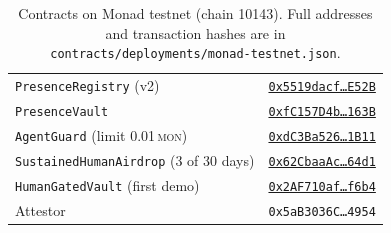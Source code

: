 \documentclass[10pt]{article}
\newcommand{\code}[1]{\texttt{\small #1}}
\newcommand{\mon}{\textsc{mon}}
\begin{document}
\begin{table}[h]\small\centering
\caption{Contracts on Monad testnet (chain 10143). Full addresses and transaction hashes are in
\code{contracts/deployments/monad-testnet.json}.}\label{tab:contracts}
\begin{tabular}{@{}ll@{}}\toprule
\code{PresenceRegistry} (v2) & \href{https://testnet.monadvision.com/address/0x5519dacface816519ACa3ee3cD592fd4c61dE52B}{\code{0x5519dacf\ldots E52B}}\\
\code{PresenceVault} & \href{https://testnet.monadvision.com/address/0xfC157D4b8D9573413a3A793056D7625eD972163B}{\code{0xfC157D4b\ldots 163B}}\\
\code{AgentGuard} (limit 0.01\,\mon{}) & \href{https://testnet.monadvision.com/address/0xdC3Ba526FF565D0c76131D54a30aFA3c55041B11}{\code{0xdC3Ba526\ldots 1B11}}\\
\code{SustainedHumanAirdrop} (3 of 30 days) & \href{https://testnet.monadvision.com/address/0x62CbaaAc53ef415fE0262E41e3ce4C2B9af164d1}{\code{0x62CbaaAc\ldots 64d1}}\\
\code{HumanGatedVault} (first demo) & \href{https://testnet.monadvision.com/address/0x2AF710af85914DEe0AA89017223638367645f6b4}{\code{0x2AF710af\ldots f6b4}}\\
Attestor & \code{0x5aB3036C\ldots 4954}\\\bottomrule
\end{tabular}
\end{table}
\end{document}
